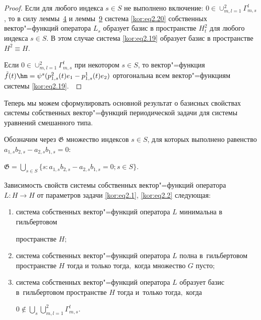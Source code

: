 \smallskip



\begin{proof} Если для любого индекса $s\in S$ не выполнено включение: $0\in\cup_{m,l=1}^2\Gamma_{m,s}^l$, то в силу леммы~\hyperlink{korn:lemma:4}{4} и леммы~\hyperlink{korn:lemma:9}{9}  система \eqref{kor:eq2.20} собственных вектор"=функций оператора $L_s$ образует базис в пространстве $H_t^2$ для любого индекса $s\in S$. В этом случае система \eqref{kor:eq2.19} образует базис в пространстве $H^2\equiv H$.



Если $0\in\cup_{m,l=1}^2\Gamma_{m,s}^l$ при некотором $s\in S$, то вектор"=функция $\tilde f(t)\hm =\psi^s(p_{1,s}^2(t)e_1-p_{1,s}^1(t)e_2)$ ортогональна всем вектор"=функциям системы \eqref{kor:eq2.19}.~\end{proof}





\smallskip



Теперь мы можем сформулировать основной результат о базисных свойствах системы собственных вектор"=функций периодической задачи для системы уравнений смешанного типа. 

Обозначим через $\mathfrak{G}$ множество индексов $s\in S$, для которых выполнено равенство $a_{1,s}b_{2,s}-a_{2,s}b_{1,s}=0$:



\centerline{$\mathfrak{G}=\bigcup\limits_{s\in S}\bigl\{s:a_{1,s}b_{2,s}-a_{2,s}b_{1,s}=0; s\in S\bigr\}.$}



\smallskip



\begin{theorem}[4] Зависимость свойств системы собственных вектор"=функций оператора $L:H\to H$ от параметров задачи \eqref{kor:eq2.1}, \eqref{kor:eq2.2} следующая\/$:$

\begin{enumerate}

\item[\rm 1)] система собственных вектор"=функций оператора $L$ минимальна \linebreak в гильбертовом 

пространстве $H;$

\item[\rm 2)] 

система собственных вектор"=функций оператора $L$ полна в~гильбертовом пространстве $H$ тогда и только тогда$,$ когда множество $G$ пусто$;$

\item[\rm 3)] система собственных вектор"=функций оператора $L$ образует базис в~гильбертовом пространстве $H$ тогда и~только тогда$,$ когда 



\centerline{$0\notin\bigcup\limits_s{\bigcup\limits_{m,l=1}^2{\Gamma_{m,s}^l}}.$}

\end{enumerate}

\end{theorem}



